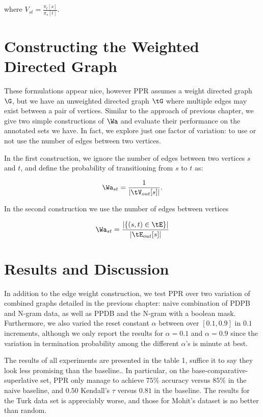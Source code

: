 where $V_{st} = \frac{\pi_t[s]}{\pi_s[t]}.$

\section{Constructing the Weighted Directed Graph}

These formulations appear nice, however PPR assumes a weight directed graph $\G$, but we have an unweighted directed graph $\tG$ where multiple edges may exist between a pair of vertices. Similar to the approach of previous chapter, we give two simple constructions of $\Wa$ and evaluate their performance on the annotated sets we have. In fact, we explore just one factor of variation: to use or not use the number of edges between two vertices. 

In the first construction, we ignore the number of edges between two vertices $s$ and $t$, and define the probability of transitioning from $s$ to $t$ as:

\begin{equation}
	\Wa_{st} = \frac{1}{|\tV_{out}[s]|}.
\end{equation}

In the second construction we use the number of edges between vertices

\begin{equation}
	\Wa_{st} = \frac{|\{(s,t) \in \tE \}|}{|\tE_{out}[s]|}
\end{equation}

\section{Results and Discussion}

In addition to the edge weight construction, we test PPR over two variation of combined graphs detailed in the previous chapter: naive combination of PDPB and N-gram data, as well as PPDB and the N-gram with a boolean mask. Furthermore, we also varied the reset constant $\alpha$ between over $[0.1,0.9]$ in $0.1$ increments, although we only report the results for $\alpha = 0.1$ and $\alpha = 0.9$ since the variation in termination probability among the different $\alpha$'s is minute at best.

The results of all experiments are presented in the table 1, suffice it to say they look less promising than the baseline.. In particular, on the base-comparative-superlative set, PPR only manage to achieve $75\%$ accuracy versus $85\%$ in the naive baseline, and $0.50$ Kendall's $\tau$ versus $0.81$ in the baseline. The results for the Turk data set is appreciably worse, and those for Mohit's dataset is no better than random.

